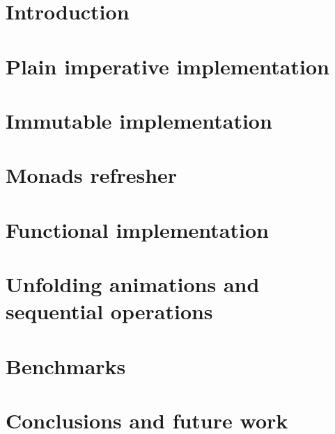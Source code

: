 \documentclass[a4paper]{article}
\begin{document}
\section{Introduction}
\label{sec:intro}
 

\section{Plain imperative implementation}
\label{sec:imperative_implementation}
 

\section{Immutable implementation}
\label{sec:immutable_implementation}
 

\section{Monads refresher}
\label{sec:monads_refresher}
 

\section{Functional implementation}
\label{sec:functional_implementation}

\section{Unfolding animations and sequential operations}
\label{sec:unfold_monad}
% 

\section{Benchmarks}
\label{sec:benchmarks}
% 

\section{Conclusions and future work}
\label{sec:conclusions}
% 


 
\cite{*}
\nocite{}
\end{document}
